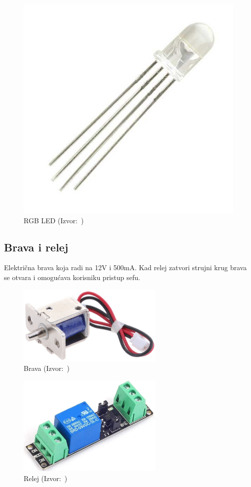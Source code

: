 \begin{figure}[h!]
    \centering
    \includegraphics[scale=0.7]{images/rgb-led}
    \caption{RGB LED (Izvor:~\cite{robotistan-led})}
\end{figure}

\subsection{Brava i relej}

Električna brava koja radi na 12V i 500mA\@.
Kad relej zatvori strujni krug brava se otvara i omogućava korisniku pristup sefu.

\begin{figure}[h!]
    \centering
    \includegraphics[width=200pt]{images/door-lock}
    \caption{Brava (Izvor:~\cite{ebay-doorlock})}
\end{figure}

\begin{figure}[h!]
    \centering
    \includegraphics[width=200pt]{images/relay}
    \caption{Relej (Izvor:~\cite{amazon-relay})}
\end{figure}

